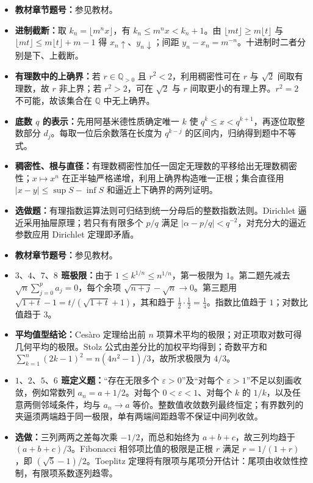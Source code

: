 \begin{itemize}
\item \textbf{教材章节题号：}参见教材。
\item \textbf{进制截断：}取 $k_n=\lfloor m^n x\rfloor$，有 $k_n\le m^n x<k_n+1$。由 $\lfloor mt\rfloor\ge m\lfloor t\rfloor$ 与 $\lfloor mt\rfloor\le m\lfloor t\rfloor+m-1$ 得 $x_n\uparrow$、$y_n\downarrow$；间距 $y_n-x_n=m^{-n}$。十进制时二者分别是下、上截断。
\item \textbf{有理数中的上确界：}若 $r\in\mathbb Q_{>0}$ 且 $r^2<2$，利用稠密性可在 $r$ 与 $\sqrt2$ 间取有理数，故 $r$ 非上界；若 $r^2>2$，可在 $\sqrt2$ 与 $r$ 间取更小的有理上界。$r^2=2$ 不可能，故该集合在 $\mathbb Q$ 中无上确界。
\item \textbf{底数 $q$ 的表示：}先用阿基米德性质确定唯一 $k$ 使 $q^k\le x<q^{k+1}$，再逐位取整数部分 $d_j$。每取一位后余数落在长度为 $q^{k-j}$ 的区间内，归纳得到题中不等式。
\item \textbf{稠密性、根与直径：}有理数稠密性加任一固定无理数的平移给出无理数稠密性；$x\mapsto x^n$ 在正半轴严格递增，利用上确界构造唯一正根；集合直径用 $|x-y|\le\sup S-\inf S$ 和逼近上下确界的两列证明。
\item \textbf{选做题：}有理指数运算法则可归结到统一分母后的整数指数法则。Dirichlet 逼近采用抽屉原理；若只有有限多个 $p/q$ 满足 $|\alpha-p/q|<q^{-2}$，对充分大的逼近参数应用 Dirichlet 定理即矛盾。
\end{itemize}

\begin{itemize}
\item \textbf{教材章节题号：}参见教材。
\item \textbf{$3、4、7、8$ 班极限：}由于 $1\le k^{1/n}\le n^{1/n}$，第一极限为 $1$。第二题先减去 $\sqrt n\sum_{j=0}^p a_j=0$，每个余项 $\sqrt{n+j}-\sqrt n\to0$。第三题用 $\sqrt{1+t}-1=t/(\sqrt{1+t}+1)$，其和趋于 $\tfrac12\cdot\tfrac12=\tfrac14$。指数比值趋于 $1$；对数比值趋于 $3$。
\item \textbf{平均值型结论：}Cesàro 定理给出前 $n$ 项算术平均的极限；对正项取对数可得几何平均的极限。Stolz 公式由差分比的加权平均得到；奇数平方和 $\sum_{k=1}^n(2k-1)^2=n(4n^2-1)/3$，故所求极限为 $4/3$。
\item \textbf{$1、2、5、6$ 班定义题：}“存在无限多个 $\varepsilon>0$”及“对每个 $\varepsilon>1$”不足以刻画收敛，例如常数列 $a_n=a+1/2$。对每个 $0<\varepsilon<1$、对每个 $k$ 的 $1/k$，以及任意两侧邻域条件，均与 $a_n\to a$ 等价。整数值收敛数列最终恒定；有界数列的夹逼须两端趋于同一极限，单有两端间距趋零不保证中间列收敛。
\item \textbf{选做：}三列两两之差每次乘 $-1/2$，而总和始终为 $a+b+c$，故三列均趋于 $(a+b+c)/3$。Fibonacci 相邻项比值的极限是正根 $r$ 满足 $r=1/(1+r)$，即 $(\sqrt5-1)/2$。Toeplitz 定理将有限项与尾项分开估计：尾项由收敛性控制，有限项系数逐列趋零。
\end{itemize}


